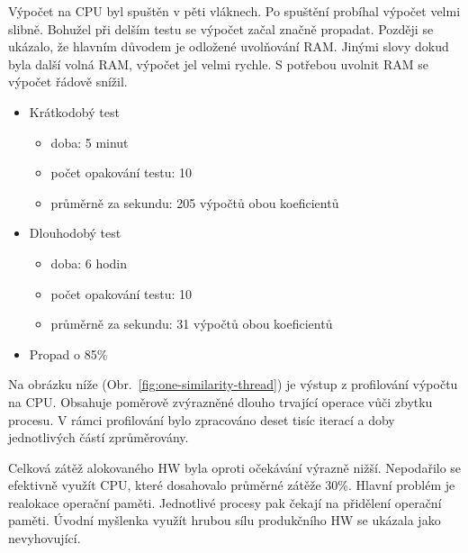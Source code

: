 Výpočet na CPU byl spuštěn v pěti vláknech. Po spuštění probíhal výpočet velmi slibně. Bohužel při delším testu se výpočet začal značně propadat. Později se ukázalo, že hlavním důvodem je odložené uvolňování RAM. Jinými slovy dokud byla další volná RAM, výpočet jel velmi rychle. S potřebou uvolnit RAM se výpočet řádově snížil.
\begin{itemize}
	\setlength{\parskip}{0pt}
	\setlength{\itemsep}{0pt}
	\item {Krátkodobý test}
		\begin{itemize}
			\setlength{\parskip}{0pt}
			\setlength{\itemsep}{0pt}
			\item {doba: 5 minut}
			\item {počet opakování testu: 10}
			\item {průměrně za sekundu: 205 výpočtů obou koeficientů}
		\end{itemize}
	\item {Dlouhodobý test}
		\begin{itemize}
			\setlength{\parskip}{0pt}
			\setlength{\itemsep}{0pt}
			\item {doba: 6 hodin}
			\item {počet opakování testu: 10}
			\item {průměrně za sekundu: 31 výpočtů obou koeficientů}
		\end{itemize}
	\item {Propad o 85\%}
\end{itemize}

Na obrázku níže (Obr.~\ref{fig:one-similarity-thread}) je výstup z profilování výpočtu na CPU. Obsahuje poměrově zvýrazněné dlouho trvající operace vůči zbytku procesu. V rámci profilování bylo zpracováno deset tisíc iterací a doby jednotlivých částí zprůměrovány.

Celková zátěž alokovaného HW byla oproti očekávání výrazně nižší. Nepodařilo se efektivně využít CPU, které dosahovalo průměrné zátěže 30\%. Hlavní problém je realokace operační paměti. Jednotlivé procesy pak čekají na přidělení operační paměti. Úvodní myšlenka využít hrubou sílu produkčního HW se ukázala jako nevyhovující.

